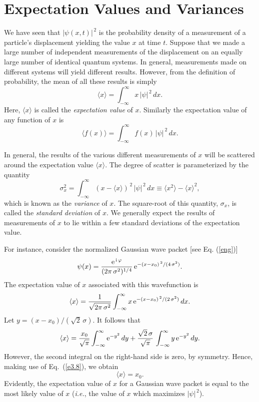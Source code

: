 \section{Expectation Values and Variances}
We have seen that $|\psi(x,t)|^{\,2}$ is the probability density of a
measurement of a particle's displacement yielding the value $x$ at time $t$. 
Suppose that we made a large number of independent measurements of the
displacement on
an equally  large number of identical quantum systems. In general, measurements
made on different systems will yield different results. However, from the
definition of probability, the
mean  of all these results is simply
\begin{equation}\label{e3.22}
\langle x\rangle = \int_{-\infty}^{\infty} x\,|\psi|^{\,2}\,dx.
\end{equation}
Here,
$\langle x\rangle$ is called the {\em expectation value}\/ of $x$.
Similarly the expectation value of any function of $x$ is
\begin{equation}
\langle f(x)\rangle = \int_{-\infty}^{\infty} f(x)\,|\psi|^{\,2}\,dx.
\end{equation}

In general, the results of the various different measurements of $x$ will be scattered
around the expectation value $\langle x\rangle$. The
degree of scatter is parameterized by  the quantity
\begin{equation}\label{e3.24a}
\sigma^2_x = \int_{-\infty}^{\infty} \left(x-\langle x\rangle\right)^{\,2}\,|\psi|^{\,2}\,dx \equiv \langle x^2\rangle -\langle x\rangle^{2},
\end{equation}
which is known as the {\em variance}\/ of $x$. The square-root of this
quantity, $\sigma_x$, is called the {\em standard deviation}\/ of $x$.
We generally expect  the results of measurements of $x$ to lie
within a few standard deviations of the expectation value.

For instance, consider the normalized Gaussian wave packet [see Eq. (\ref{eng})]
 \begin{equation}\label{e3.24}
\psi(x) = \frac{{\rm e}^{\,{\rm i}\,\varphi}}{(2\pi\,\sigma^2)^{1/4}}\,{\rm e}^{-(x-x_0)^{\,2}/(4\,\sigma^2)}.
\end{equation}
The expectation value of $x$ associated with this wavefunction is 
\begin{equation}
\langle x\rangle = \frac{1}{\sqrt{2\pi\,\sigma^2}}\int_{-\infty}^{\infty}
x\,{\rm e}^{-(x-x_0)^{\,2}/(2\,\sigma^2)}\,dx.
\end{equation}
Let $y=(x-x_0)/(\sqrt{2}\,\sigma)$. It follows that
\begin{equation}
\langle x\rangle = \frac{x_0}{\sqrt{\pi}}\int_{-\infty}^{\infty}{\rm e}^{-y^2}\,dy+\frac{\sqrt{2}\,\sigma}{\sqrt{\pi}}\,\int_{-\infty}^{\infty}y\,{\rm e}^{-y^2}\,dy.
\end{equation}
However, the second integral on the right-hand side is zero, by symmetry. 
Hence, making use of Eq.~(\ref{e3.8}), we obtain
\begin{equation}
\langle x\rangle =x_0.
\end{equation}
Evidently,  the expectation value of $x$ for a Gaussian wave packet is
equal to the most likely value of $x$ ({\em i.e.}, the value of $x$ which
maximizes $|\psi|^{\,2}$).

